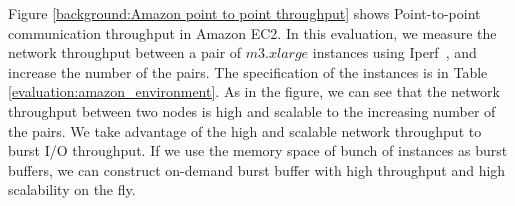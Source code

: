 Figure \ref{background:Amazon point to point throughput} shows Point-to-point
communication throughput in Amazon EC2. In this evaluation,
we measure the network throughput between a pair of $m3.xlarge$ instances using
Iperf~\cite{iperf}, and increase the number of the pairs. The specification of
the instances is in Table \ref{evaluation:amazon_environment}.
As in the figure, we can see that the network throughput between two nodes is
high and scalable to the increasing number of the pairs.
We take advantage of the high and scalable network throughput to burst I/O
throughput. If we use the memory space of bunch of instances as burst
buffers, we can construct on-demand burst buffer with high throughput
and high scalability on the fly.


